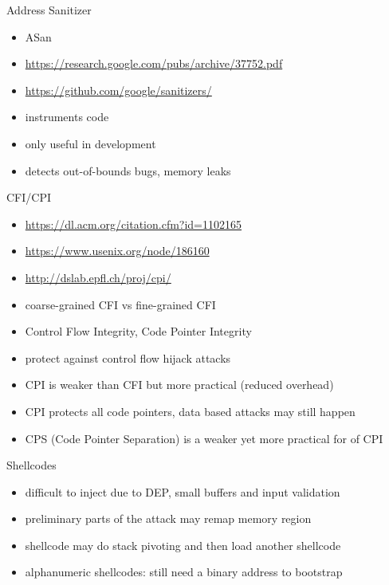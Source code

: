 \documentclass{curs}
\begin{document}
\begin{frame}{Address Sanitizer}
  \begin{itemize}
    \pause \item ASan
    \pause \item \url{https://research.google.com/pubs/archive/37752.pdf}
    \pause \item \url{https://github.com/google/sanitizers/}
    \pause \item instruments code
    \pause \item only useful in development
    \pause \item detects out-of-bounds bugs, memory leaks
  \end{itemize}
\end{frame}

\begin{frame}{CFI/CPI}
  \begin{itemize}
    \pause \item \url{https://dl.acm.org/citation.cfm?id=1102165}
    \item \url{https://www.usenix.org/node/186160}
    \item \url{http://dslab.epfl.ch/proj/cpi/}
    \pause \item coarse-grained CFI vs fine-grained CFI
    \pause \item Control Flow Integrity, Code Pointer Integrity
    \pause \item protect against control flow hijack attacks
    \pause \item CPI is weaker than CFI but more practical (reduced overhead)
    \pause \item CPI protects all code pointers, data based attacks may still happen
    \pause \item CPS (Code Pointer Separation) is a weaker yet more practical for of CPI
  \end{itemize}
\end{frame}

\begin{frame}{Shellcodes}
  \begin{itemize}
    \pause \item difficult to inject due to DEP, small buffers and input validation
    \pause \item preliminary parts of the attack may remap memory region
    \pause \item shellcode may do stack pivoting and then load another shellcode
    \pause \item alphanumeric shellcodes: still need a binary address to bootstrap
  \end{itemize}
\end{frame}
\end{document}
